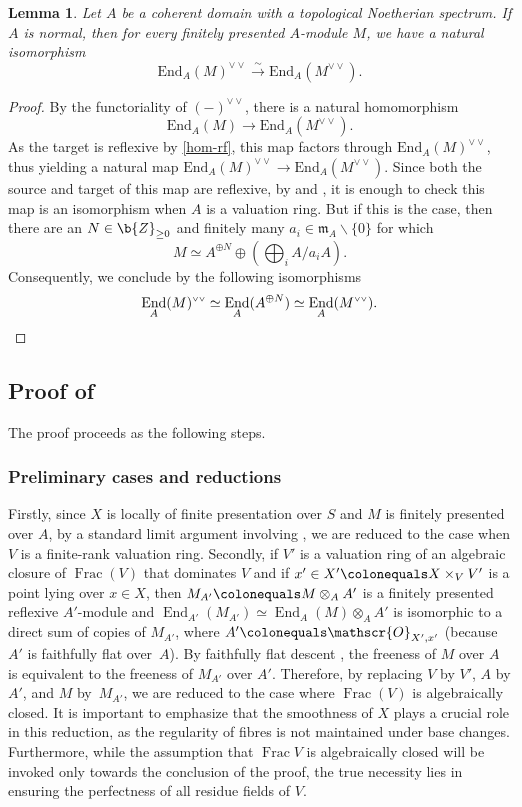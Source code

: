 \documentclass[JEP,XML,SOM,Unicode,published]{cedram}
\let\oldvee\vee
\renewcommand{\vee}{{\scriptscriptstyle\oldvee}}
\let\ts\textstyle
\let\backslash\smallsetminus
\newcommand{\fm}{\mathfrak{m}}
\newcommand{\sO}{\mathscr{O}}
\let\ce\colonequals
\newcommand{\isoto}{\overset{\sim}{\longrightarrow}}
\newcommand{\ddual}{\vee\vee}
\DeclareMathOperator{\Frac}{Frac}
\DeclareMathOperator{\End}{End}
\newcommand{\bpf}{\begin{proof}}
\newcommand{\epf}{\end{proof}}
\newcommand{\blemt}{\begin{lemma-tweak}}
\newcommand{\elemt}{\end{lemma-tweak}}
\providecommand{\SPD}[2]{\cite[\href{https://stacks.math.columbia.edu/tag/#1}{#1}, \href{https://stacks.math.columbia.edu/tag/#2}{#2}]{SP}}
\theoremstyle{plain}
\newtheorem{lemma-tweak}[subsection]{Lemma}
\theoremstyle{definition}
\begin{document}
\blemt \label{lem on dual and hom}
Let $A$ be a coherent domain with a topological Noetherian spectrum. If $A$ is normal, then for every finitely presented $A$\nobreakdash-mod\-ule $M$, we have a natural isomorphism
\[
\mathrm{End}_A(M)^{\ddual} \isoto \mathrm{End}_A(M^{\ddual}).
\]
\elemt
\bpf
By the functoriality of $(-)^{\ddual}$, there is a natural homomorphism
\[
\mathrm{End}_A(M) \to \mathrm{End}_A(M^{\ddual}).
\]
As the target is reflexive by \eqref{hom-rf}, this map factors through $\mathrm{End}_A(M)^{\ddual}$, thus yielding a natural map $\mathrm{End}_A(M)^{\ddual} \to \mathrm{End}_A(M^{\ddual})$.
Since both the source and target of this map are reflexive, by  and , it is enough to check this map is an isomorphism when $A$ is a valuation ring.
But if this is the case, then there are an $N\in \b{Z}_{\geq 0}$ and finitely many $a_i\in \fm_A\backslash \{0\}$ for which
\[
\ts M\simeq A^{\oplus N} \oplus (\bigoplus_i A/a_i A).
\]
Consequently, we conclude by the following isomorphisms
\[
\End_A(M)^{\ddual} \simeq \End_A(A^{\oplus N}) \simeq \End_A(M^{\ddual}). \qedhere
\]
\epf

\subsection{Proof of }\label{proof of aus-flat}
The proof proceeds as the following steps.

\subsubsection*{Preliminary cases and reductions}
Firstly, since $X$ is locally of finite presentation over $S$ and $M$ is finitely presented over $A$, by a standard limit argument involving , we are reduced to the case when $V$ is a finite-rank valuation ring. Secondly, if $V'$ is a valuation ring of an algebraic closure of $\Frac (V)$ that dominates $V$ and if $x'\in X'\ce X\times_VV'$ is a point lying over $x\in X$, then $M_{A'}\ce M\otimes_A A'$ is a finitely presented reflexive $A'$\nobreakdash-mod\-ule and $\End_{A'}(M_{A'}) \simeq \End_{A}(M)\otimes_AA'$ is isomorphic to a direct sum of copies of $M_{A'}$, where $A'\ce \sO_{X',x'}$ (because $A'$ is faithfully flat over~$A$).
By faithfully flat descent \SPD{08XD}{00NX}, the freeness of $M$ over $A$ is equivalent to the freeness of $M_{A'}$ over $A'$. Therefore, by replacing $V$ by $V'$, $A$ by $A'$, and $M$ by~$M_{A'}$, we are reduced to the case where $\Frac (V)$ is algebraically closed.
{It is important to emphasize that the smoothness of
$X$ plays a crucial role in this reduction, as the regularity of fibres is not maintained under base changes.
Furthermore, while the assumption that $\Frac V$ is algebraically closed will be invoked only towards the conclusion of the proof, the true necessity lies in ensuring the perfectness of all residue fields of $V$.}
\end{document}
